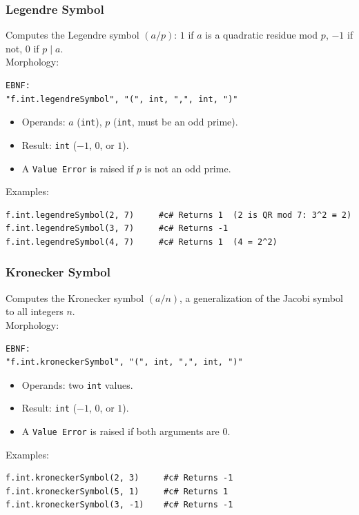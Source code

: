 \subsubsection{Legendre Symbol}
Computes the Legendre symbol $(a/p)$: $1$ if $a$ is a quadratic residue mod $p$, $-1$ if not, $0$ if $p \mid a$. \\
Morphology:
\begin{verbatim}
EBNF:
"f.int.legendreSymbol", "(", int, ",", int, ")"
\end{verbatim}
\begin{itemize}
\item Operands: $a$ (\texttt{int}), $p$ (\texttt{int}, must be an odd prime).
\item Result: \texttt{int} ($-1$, $0$, or $1$).
\item A \texttt{Value Error} is raised if $p$ is not an odd prime.
\end{itemize}
Examples:
\begin{verbatim}
f.int.legendreSymbol(2, 7)     #c# Returns 1  (2 is QR mod 7: 3^2 ≡ 2)
f.int.legendreSymbol(3, 7)     #c# Returns -1
f.int.legendreSymbol(4, 7)     #c# Returns 1  (4 = 2^2)
\end{verbatim}

\subsubsection{Kronecker Symbol}
Computes the Kronecker symbol $(a/n)$, a generalization of the Jacobi symbol to all integers $n$. \\
Morphology:
\begin{verbatim}
EBNF:
"f.int.kroneckerSymbol", "(", int, ",", int, ")"
\end{verbatim}
\begin{itemize}
\item Operands: two \texttt{int} values.
\item Result: \texttt{int} ($-1$, $0$, or $1$).
\item A \texttt{Value Error} is raised if both arguments are $0$.
\end{itemize}
Examples:
\begin{verbatim}
f.int.kroneckerSymbol(2, 3)     #c# Returns -1
f.int.kroneckerSymbol(5, 1)     #c# Returns 1
f.int.kroneckerSymbol(3, -1)    #c# Returns -1
\end{verbatim}


